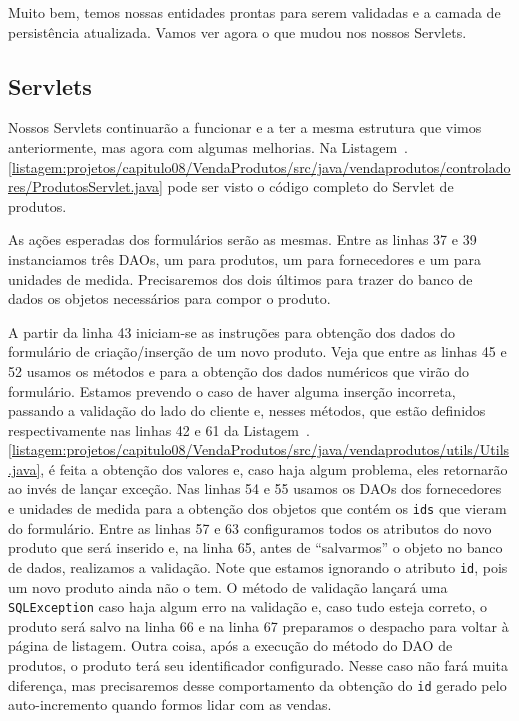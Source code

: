 Muito bem, temos nossas entidades prontas para serem validadas e a camada de persistência atualizada. Vamos ver agora o que mudou nos nossos Servlets.


\subsection{Servlets}

Nossos Servlets continuarão a funcionar e a ter a mesma estrutura que vimos anteriormente, mas agora com algumas melhorias. Na Listagem~\thechapter.\ref{listagem:projetos/capitulo08/VendaProdutos/src/java/vendaprodutos/controladores/ProdutosServlet.java} pode ser visto o código completo do Servlet de produtos.


As ações esperadas dos formulários serão as mesmas. Entre as linhas 37 e 39 instanciamos três DAOs, um para produtos, um para fornecedores e um para unidades de medida. Precisaremos dos dois últimos para trazer do banco de dados os objetos necessários para compor o produto.

A partir da linha 43 iniciam-se as instruções para obtenção dos dados do formulário de criação/inserção de um novo produto. Veja que entre as linhas 45 e 52 usamos os métodos  e  para a obtenção dos dados numéricos que virão do formulário. Estamos prevendo o caso de haver alguma inserção incorreta, passando a validação do lado do cliente e, nesses métodos, que estão definidos respectivamente nas linhas 42 e 61 da Listagem~\thechapter.\ref{listagem:projetos/capitulo08/VendaProdutos/src/java/vendaprodutos/utils/Utils.java}, é feita a obtenção dos valores e, caso haja algum problema, eles retornarão  ao invés de lançar exceção. Nas linhas 54 e 55 usamos os DAOs dos fornecedores e unidades de medida para a obtenção dos objetos que contém os \texttt{ids} que vieram do formulário. Entre as linhas 57 e 63 configuramos todos os atributos do novo produto que será inserido e, na linha 65, antes de ``salvarmos'' o objeto no banco de dados, realizamos a validação. Note que estamos ignorando o atributo \texttt{id}, pois um novo produto ainda não o tem. O método de validação lançará uma \texttt{SQLException} caso haja algum erro na validação e, caso tudo esteja correto, o produto será salvo na linha 66 e na linha 67 preparamos o despacho para voltar à página de listagem. Outra coisa, após a execução do método  do DAO de produtos, o produto terá seu identificador configurado. Nesse caso não fará muita diferença, mas precisaremos desse comportamento da obtenção do \texttt{id} gerado pelo auto-incremento quando formos lidar com as vendas.

